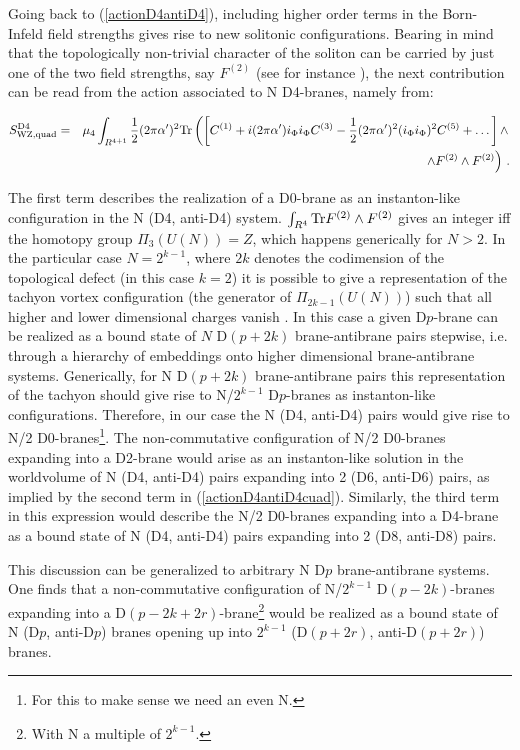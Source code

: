 \documentclass[12pt,a4paper]{article}
\begin{document}
Going back to (\ref{actionD4antiD4}),
including higher order terms in the Born-Infeld field strengths 
gives rise to new solitonic configurations. Bearing in 
mind that the topologically non-trivial character of the soliton 
can be carried by just one of the two field strengths, say $F^{(2)}$
(see for instance \cite{Sen2}),
the next contribution can be read from the action associated to
N D4-branes, namely from:

\begin{eqnarray}
\label{actionD4antiD4cuad}
S_{{\rm WZ,quad}}^{\rm D4}&=&\mu_4 \int_{R^{4+1}}
\frac12 (2\pi\alpha^\prime)^2{\rm Tr}\left(\left[C^{(1)}+
i(2\pi\alpha^\prime)i_\Phi i_\Phi
C^{(3)}-\frac12 (2\pi\alpha^\prime)^2 (i_\Phi i_\Phi)^2 
C^{(5)}+\dots\right]\wedge \right.\nonumber\\
&&\left. \wedge F^{(2)}\wedge F^{(2)}\right)\, .
\end{eqnarray}

\noindent The first term describes the realization of a 
D0-brane
as an instanton-like configuration in the N (D4, anti-D4) system.
$\int_{R^4} {\rm Tr}F^{(2)}\wedge F^{(2)}$ gives an integer iff
the homotopy group $\Pi_3(U(N))=Z$, which happens generically
for $N>2$. In the particular case $N=2^{k-1}$, where $2k$ denotes 
the codimension of the topological defect (in this case $k=2$)
it is possible to give a representation of the tachyon vortex
configuration (the generator of $\Pi_{2k-1}(U(N))$) such that all
higher and lower dimensional charges vanish \cite{Witten}. 
In this case
a given D$p$-brane can be realized as a bound state of $N$ D$(p+2k)$ 
brane-antibrane pairs stepwise, i.e. through a hierarchy of 
embeddings onto higher dimensional brane-antibrane systems.
Generically, for N D$(p+2k)$ brane-antibrane pairs this
representation of the tachyon should give rise to N/$2^{k-1}$
D$p$-branes as instanton-like configurations. Therefore, in
our case the N (D4, anti-D4) pairs would give rise to N/2
D0-branes\footnote{For this to make sense we need an even N.}.
The non-commutative configuration of N/2 D0-branes 
expanding into a D2-brane would arise as an instanton-like solution
in the worldvolume of N (D4, anti-D4) pairs expanding into
2 (D6, anti-D6) pairs, as implied by the second term in
(\ref{actionD4antiD4cuad}). Similarly, the third term in this
expression would describe the N/2 D0-branes expanding into a D4-brane
as a bound state of N (D4, anti-D4) pairs expanding into
2 (D8, anti-D8) pairs.

This discussion can be generalized to arbitrary N D$p$
brane-antibrane systems. One finds that a non-commutative
configuration of N/$2^{k-1}$ D$(p-2k)$-branes expanding into
a D$(p-2k+2r)$-brane\footnote{With N a multiple of $2^{k-1}$.}
would be realized as a bound state of
N (D$p$, anti-D$p$) branes opening up into $2^{k-1}$
(D$(p+2r)$, anti-D$(p+2r)$) branes.
\end{document}
